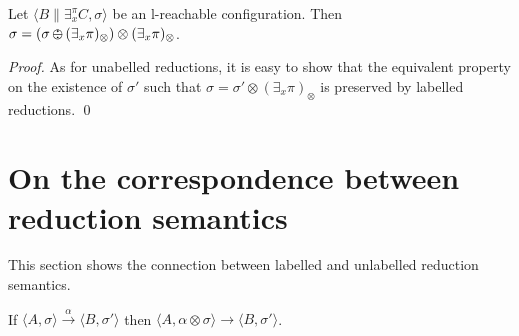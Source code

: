 \documentclass{llncs}
\def\C{{\mathcal C}}
\def\C{{\mathcal C}}
\def\odiv{\, {\ominus\hspace{-7.7pt} \div} \,}
\begin{document}

\begin{lemma}
\label{l-mono2}
Let 
$\langle B \parallel \exists_x^\pi C, \sigma \rangle$ 
be an l-reachable configuration. 
Then 
$\sigma = (\sigma \odiv (\exists_x \pi)_\otimes) \otimes (\exists_x \pi)_\otimes$.
\end{lemma}

\begin{proof}
As for unabelled reductions, it is easy to show that the equivalent property
on the existence of $\sigma'$ such that 
$\sigma = \sigma' \otimes (\exists_x \pi)_\otimes$ is preserved by 
labelled reductions. 
\qed
\end{proof}


\section{On the correspondence between reduction semantics}
\label{corres}
This section shows the connection between labelled and unlabelled reduction semantics.
%

\begin{theorem}[Soundness]
\label{sound}
If $\langle A, \sigma \rangle \xrightarrow{\alpha} \langle B, \sigma' \rangle$
then %
$\langle A, \alpha \otimes \sigma \rangle \to \langle B, \sigma' \rangle$.
\end{theorem}
\end{document}
